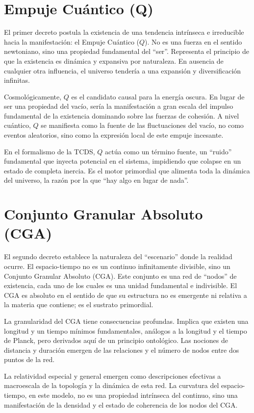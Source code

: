 \documentclass[12pt,openright]{book}
\newcommand{\CGA}{CGA}
\begin{document}
\section{Empuje Cuántico (Q)}
El primer decreto postula la existencia de una tendencia intrínseca e irreducible hacia la manifestación: el Empuje Cuántico (\(Q\)). No es una fuerza en el sentido newtoniano, sino una propiedad fundamental del ``ser''. Representa el principio de que la existencia es dinámica y expansiva por naturaleza. En ausencia de cualquier otra influencia, el universo tendería a una expansión y diversificación infinitas.

Cosmológicamente, \(Q\) es el candidato causal para la energía oscura. En lugar de ser una propiedad del vacío, sería la manifestación a gran escala del impulso fundamental de la existencia dominando sobre las fuerzas de cohesión. A nivel cuántico, \(Q\) se manifiesta como la fuente de las fluctuaciones del vacío, no como eventos aleatorios, sino como la expresión local de este empuje incesante.

En el formalismo de la TCDS, \(Q\) actúa como un término fuente, un ``ruido'' fundamental que inyecta potencial en el sistema, impidiendo que colapse en un estado de completa inercia. Es el motor primordial que alimenta toda la dinámica del universo, la razón por la que ``hay algo en lugar de nada''.

\section{Conjunto Granular Absoluto (CGA)}
El segundo decreto establece la naturaleza del ``escenario'' donde la realidad ocurre. El espacio-tiempo no es un continuo infinitamente divisible, sino un Conjunto Granular Absoluto (\CGA). Este conjunto es una red de ``nodos'' de existencia, cada uno de los cuales es una unidad fundamental e indivisible. El \CGA{} es absoluto en el sentido de que su estructura no es emergente ni relativa a la materia que contiene; es el sustrato primordial.

La granularidad del \CGA{} tiene consecuencias profundas. Implica que existen una longitud y un tiempo mínimos fundamentales, análogos a la longitud y el tiempo de Planck, pero derivados aquí de un principio ontológico. Las nociones de distancia y duración emergen de las relaciones y el número de nodos entre dos puntos de la red.

La relatividad especial y general emergen como descripciones efectivas a macroescala de la topología y la dinámica de esta red. La curvatura del espacio-tiempo, en este modelo, no es una propiedad intrínseca del continuo, sino una manifestación de la densidad y el estado de coherencia de los nodos del \CGA.
\end{document}
